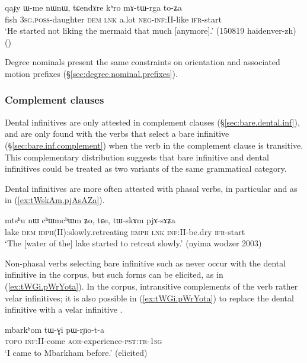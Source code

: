 \begin{exe}
\ex  \label{ex:mAtWrga}
\gll qaɟy ɯ-me nɯnɯ, tɕendɤre kʰro mɤ-tɯ-rga to-ʑa\\
fish \textsc{3sg}.\textsc{poss}-daughter \textsc{dem} \textsc{lnk} a.lot \textsc{neg}-\textsc{inf}:\textsc{II}-like \textsc{ifr}-start \\
\glt `He started not liking the mermaid that much [anymore].' (150819 haidenver-zh)
()
\end{exe}

Degree nominals present the same constraints on orientation and associated motion prefixes (§\ref{sec:degree.nominal.prefixes}).

\subsubsection{Complement clauses} \label{sec:dental.inf.complement}
Dental  infinitives are only attested in complement clauses (§\ref{sec:bare.dental.inf}), and are only found with the verbs that select a bare infinitive (§\ref{sec:bare.inf.complement}) when the verb in the complement clause is transitive. This complementary distribution suggests that bare infinitive and dental infinitives could be treated as two variants of the same grammatical category.

Dental infinitives are more often attested with phasal verbs, in particular  and  as in (\ref{ex:tWskAm.pjAsAZa}).

\begin{exe}
\ex \label{ex:tWskAm.pjAsAZa}
\gll mtsʰu nɯ cʰɯmcʰɯm ʑo, tɕe, tɯ-skɤm pjɤ-sɤʑa \\
lake \textsc{dem} \textsc{idph}(II):slowly.retreating \textsc{emph} \textsc{lnk} \textsc{inf}:II-be.dry \textsc{ifr}-start \\
\glt `The [water of the] lake started to retreat slowly.' (nyima wodzer 2003)
\end{exe}

Non-phasal verbs selecting bare infinitive such as  never occur with the dental infinitive in the corpus, but such forms can be elicited, as in (\ref{ex:tWGi.pWrYota}). In the corpus, intransitive complements of the verb  rather velar infinitives; it is also possible  in (\ref{ex:tWGi.pWrYota}) to replace the dental infinitive  with a velar infinitive .

\begin{exe}
\ex \label{ex:tWGi.pWrYota}
\gll  mbarkʰom tɯ-ɣi pɯ-rɲo-t-a  \\
\textsc{topo} \textsc{inf}:II-come \textsc{aor}-experience-\textsc{pst}:\textsc{tr}-\textsc{1sg} \\
\glt `I came to Mbarkham before.' (elicited)
\end{exe}

